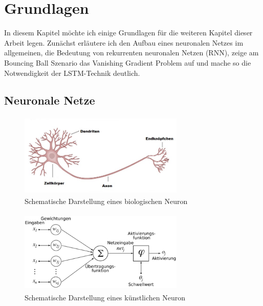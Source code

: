 \chapter{Grundlagen} 
\label{ch:grundlagen}
In diesem Kapitel möchte ich einige Grundlagen für die weiteren Kapitel dieser Arbeit legen. Zunächst erläutere ich den Aufbau eines neuronalen Netzes im allgemeinen, die Bedeutung von rekurrenten neuronalen Netzen (RNN), zeige am Bouncing Ball Szenario das Vanishing Gradient Problem auf und mache so die Notwendigkeit der LSTM-Technik deutlich.
\section{Neuronale Netze}

\begin{figure}
	\centering
	\includegraphics[width=0.7\textwidth, height=150px]{pics/neuron.jpg}	
	\caption{Schematische Darstellung eines biologischen Neuron \cite{bib:neuron}}
	
	\label{img:neuron}
\end{figure}
\begin{figure}
	\centering
	
	\includegraphics[width=0.7\textwidth, height=150px]{pics/aneuron.png}	
	\caption{Schematische Darstellung eines künstlichen Neuron \cite{bib:aneuron}}
	\label{img:aneuron}
\end{figure}

